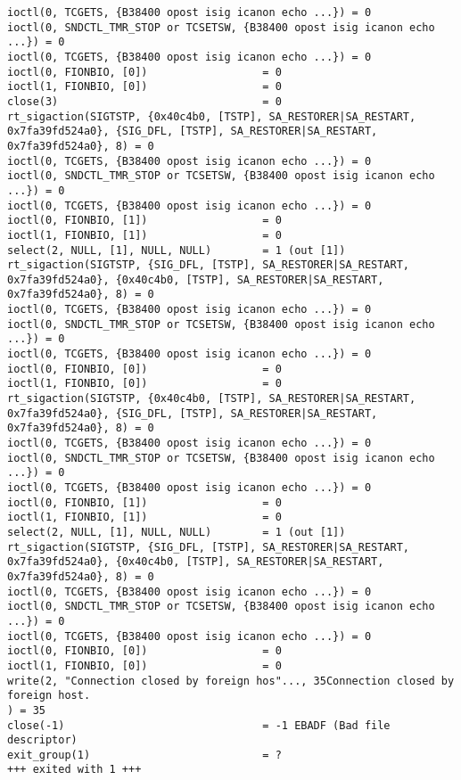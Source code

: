 \begin{lstlisting}[caption=Telnet成功時(手動),label=lst:telnet-success,linebackgroundcolor={\ifnum\value{lstnumber}>22 \ifnum\value{lstnumber}<29\color{green!30}\fi\fi}]
ioctl(0, TCGETS, {B38400 opost isig icanon echo ...}) = 0
ioctl(0, SNDCTL_TMR_STOP or TCSETSW, {B38400 opost isig icanon echo ...}) = 0
ioctl(0, TCGETS, {B38400 opost isig icanon echo ...}) = 0
ioctl(0, FIONBIO, [0])                  = 0
ioctl(1, FIONBIO, [0])                  = 0
close(3)                                = 0
rt_sigaction(SIGTSTP, {0x40c4b0, [TSTP], SA_RESTORER|SA_RESTART, 0x7fa39fd524a0}, {SIG_DFL, [TSTP], SA_RESTORER|SA_RESTART, 0x7fa39fd524a0}, 8) = 0
ioctl(0, TCGETS, {B38400 opost isig icanon echo ...}) = 0
ioctl(0, SNDCTL_TMR_STOP or TCSETSW, {B38400 opost isig icanon echo ...}) = 0
ioctl(0, TCGETS, {B38400 opost isig icanon echo ...}) = 0
ioctl(0, FIONBIO, [1])                  = 0
ioctl(1, FIONBIO, [1])                  = 0
select(2, NULL, [1], NULL, NULL)        = 1 (out [1])
rt_sigaction(SIGTSTP, {SIG_DFL, [TSTP], SA_RESTORER|SA_RESTART, 0x7fa39fd524a0}, {0x40c4b0, [TSTP], SA_RESTORER|SA_RESTART, 0x7fa39fd524a0}, 8) = 0
ioctl(0, TCGETS, {B38400 opost isig icanon echo ...}) = 0
ioctl(0, SNDCTL_TMR_STOP or TCSETSW, {B38400 opost isig icanon echo ...}) = 0
ioctl(0, TCGETS, {B38400 opost isig icanon echo ...}) = 0
ioctl(0, FIONBIO, [0])                  = 0
ioctl(1, FIONBIO, [0])                  = 0
rt_sigaction(SIGTSTP, {0x40c4b0, [TSTP], SA_RESTORER|SA_RESTART, 0x7fa39fd524a0}, {SIG_DFL, [TSTP], SA_RESTORER|SA_RESTART, 0x7fa39fd524a0}, 8) = 0
ioctl(0, TCGETS, {B38400 opost isig icanon echo ...}) = 0
ioctl(0, SNDCTL_TMR_STOP or TCSETSW, {B38400 opost isig icanon echo ...}) = 0
ioctl(0, TCGETS, {B38400 opost isig icanon echo ...}) = 0
ioctl(0, FIONBIO, [1])                  = 0
ioctl(1, FIONBIO, [1])                  = 0
select(2, NULL, [1], NULL, NULL)        = 1 (out [1])
rt_sigaction(SIGTSTP, {SIG_DFL, [TSTP], SA_RESTORER|SA_RESTART, 0x7fa39fd524a0}, {0x40c4b0, [TSTP], SA_RESTORER|SA_RESTART, 0x7fa39fd524a0}, 8) = 0
ioctl(0, TCGETS, {B38400 opost isig icanon echo ...}) = 0
ioctl(0, SNDCTL_TMR_STOP or TCSETSW, {B38400 opost isig icanon echo ...}) = 0
ioctl(0, TCGETS, {B38400 opost isig icanon echo ...}) = 0
ioctl(0, FIONBIO, [0])                  = 0
ioctl(1, FIONBIO, [0])                  = 0
write(2, "Connection closed by foreign hos"..., 35Connection closed by foreign host.
) = 35
close(-1)                               = -1 EBADF (Bad file descriptor)
exit_group(1)                           = ?
+++ exited with 1 +++
\end{lstlisting}

